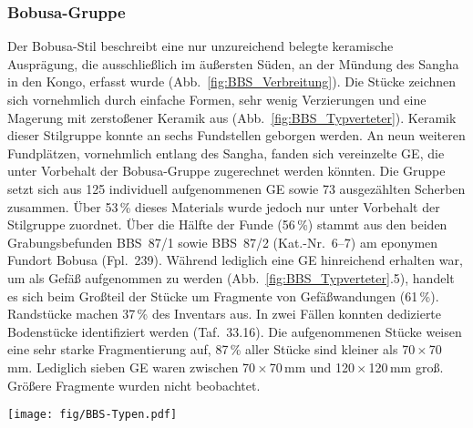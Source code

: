 \subsubsection{Bobusa-Gruppe}\label{sec:BBS-Gr}

Der Bobusa-Stil beschreibt eine nur unzureichend belegte keramische Ausprägung, die ausschließlich im äußersten Süden, an der Mündung des \mbox{Sangha} in den Kongo, erfasst wurde (Abb.~\ref{fig:BBS_Verbreitung}). Die Stücke zeichnen sich vornehmlich durch einfache Formen, sehr wenig Verzierungen und eine Magerung mit zerstoßener Keramik aus (Abb.~\ref{fig:BBS_Typverteter}). Keramik dieser Stilgruppe konnte an sechs Fundstellen geborgen werden. An neun weiteren Fundplätzen, vornehmlich entlang des \mbox{Sangha}, fanden sich vereinzelte GE, die unter Vorbehalt der Bobusa-Gruppe zugerechnet werden könnten. Die Gruppe setzt sich aus 125 individuell aufgenommenen GE sowie 73 ausgezählten Scherben zusammen. Über 53\,\% dieses Materials wurde jedoch nur unter Vorbehalt der Stilgruppe zuordnet. Über die Hälfte der Funde (56\,\%) stammt aus den beiden Grabungsbefunden BBS~87/1 sowie BBS~87/2 (Kat.-Nr.~6--7) am eponymen Fundort Bobusa (Fpl.~239). Während lediglich eine GE hinreichend erhalten war, um als Gefäß aufgenommen zu werden (Abb.~\ref{fig:BBS_Typverteter}.5), handelt es sich beim Großteil der Stücke um Fragmente von Gefäßwandungen (61\,\%). Randstücke machen 37\,\% des Inventars aus. In zwei Fällen konnten dedizierte Bodenstücke identifiziert werden (Taf.~33.16). Die aufgenommenen Stücke weisen eine sehr starke Fragmentierung auf, 87\,\% aller Stücke sind kleiner als 70\,$\times$\,70\,mm. Lediglich sieben GE waren zwischen 70\,$\times$\,70\,mm und 120\,$\times$\,120\,mm groß. Größere Fragmente wurden nicht beobachtet.

\begin{figure*}[tb]
	\begin{minipage}[b]{.8\textwidth}
		\texttt{[image: fig/BBS-Typen.pdf]}
	\end{minipage}\hfill
	\begin{minipage}[b]{.2\textwidth}
		\caption{Bobusa-Gruppe: Typvertreter.\\1:~Taf.~33.10; 2:~Taf.~37.6; 3:~Taf.~33.12; 4:~Taf.~33.11; 5:~Taf.~33.5.}
		\label{fig:BBS_Typverteter}
	\end{minipage}
\end{figure*}

